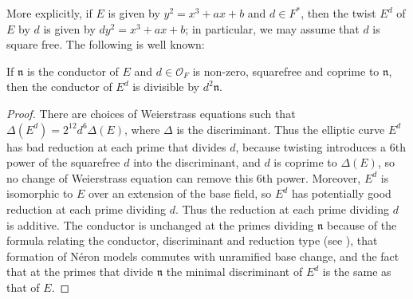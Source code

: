 \documentclass{amsart}
\newcommand{\n}{\mathfrak{n}}
\begin{document}
More explicitly, if $E$ is given by $y^2=x^3+ax+b$ and $d\in F^*$,
then the twist $E^d$ of $E$ by $d$ is given by $dy^2=x^3+ax+b$; in
particular, we may assume that $d$ is square free.  The following
is well known:
\begin{proposition}\label{twist:bound}
If $\n$ is the
conductor of $E$ and $d \in \mathcal{O}_F$ is non-zero, squarefree and coprime to $\n$, then the
conductor of $E^d$ is divisible by $d^2\n$.
\end{proposition}
\begin{proof}
There are choices of Weierstrass equations such that 
$\Delta(E^d) = 2^{12} d^6 \Delta(E)$, where $\Delta$
is the discriminant.
Thus the elliptic curve $E^d$ has bad reduction at each prime that divides $d$,
because twisting introduces a $6$th power of the squarefree $d$ into
the discriminant, and $d$ is coprime to $\Delta(E)$, so no change of
Weierstrass equation can remove this $6$th power.  Moreover, $E^d$ is
isomorphic to $E$ over an extension of the base field, so $E^d$ has
potentially good reduction at each prime dividing $d$.  Thus the
reduction at each prime dividing $d$ is additive.  The conductor is
unchanged at the primes dividing $\n$ because of the formula relating
the conductor, discriminant and reduction type (see \cite[App.~C,\S15]{silverman:aec}),
that formation of N\'eron models commutes with unramified base change,
and the fact that at the primes that divide $\n$ the minimal discriminant of $E^d$ is
the same as that of $E$.
%
\end{proof}
\end{document}
